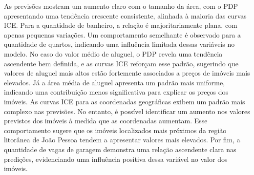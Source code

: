 \documentclass[
  12pt,
  a4paper,
]{scrreprt}
\begin{document}
\vspace{12pt}

As previsões mostram um aumento claro com o tamanho da área, com o PDP
apresentando uma tendência crescente consistente, alinhada à maioria das
curvas ICE. Para a quantidade de banheiro, a relação é majoritariamente
plana, com apenas pequenas variações. Um comportamento semelhante é
observado para a quantidade de quartos, indicando uma influência
limitada dessas variáveis no modelo. No caso do valor médio de aluguel,
o PDP revela uma tendência ascendente bem definida, e as curvas ICE
reforçam esse padrão, sugerindo que valores de aluguel mais altos estão
fortemente associados a preços de imóveis mais elevados. Já a área média
de aluguel apresenta um padrão mais uniforme, indicando uma contribuição
menos significativa para explicar os preços dos imóveis. As curvas ICE
para as coordenadas geográficas exibem um padrão mais complexo nas
previsões. No entanto, é possível identificar um aumento nos valores
previstos dos imóveis à medida que as coordenadas aumentam. Esse
comportamento sugere que os imóveis localizados mais próximos da região
litorânea de João Pessoa tendem a apresentar valores mais elevados. Por
fim, a quantidade de vagas de garagem demonstra uma relação ascendente
clara nas predições, evidenciando uma influência positiva dessa variável
no valor dos imóveis.
\end{document}
